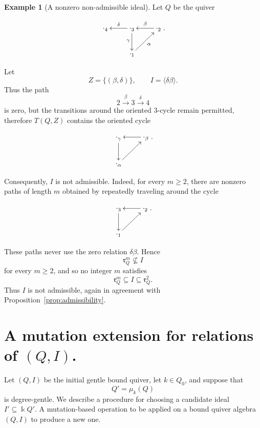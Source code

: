 \documentclass[11pt]{article}
\newcommand{\K}{\Bbbk}
\newcommand{\rad}{\mathfrak r}
\theoremstyle{plain}
\theoremstyle{definition}
\newtheorem{example}[theorem]{Example}
\theoremstyle{remark}
\begin{document}
\begin{example}[A nonzero non-admissible ideal]
Let \(Q\) be the quiver


\begin{equation}\label{}
\nonumber \xymatrix{
\cdot_{4}&\cdot_{3} \ar[d]_{\gamma} \ar[l]_{\delta}& \ar[l]_{\beta}\cdot_{2} \\
	&\cdot_{1}  \ar[ur]_{\alpha}}.
  \end{equation}


Let
\[
Z=\{(\beta,\delta)\},
\qquad
I=\langle \delta\beta\rangle.
\]
Thus the path
\[
2\xrightarrow{\beta}3\xrightarrow{\delta}4
\]
is zero, but the transitions around the oriented \(3\)-cycle remain permitted, therefore \(T(Q,Z)\) contains the oriented cycle

\begin{equation}\label{}
\nonumber \xymatrix{
\cdot_{\gamma} \ar[d] & \ar[l]\cdot_{\beta} \\
	\cdot_{\alpha}  \ar[ur]}.
  \end{equation}

Consequently, \(I\) is not admissible. Indeed, for every \(m\geq 2\), there
are nonzero paths of length \(m\) obtained by repeatedly traveling around the
cycle

\begin{equation}\label{}
\nonumber \xymatrix{
\cdot_{3} \ar[d] & \ar[l]\cdot_{2} \\
	\cdot_{1}  \ar[ur]}.
  \end{equation}

These paths never use the zero relation \(\delta\beta\). Hence
\[
\rad_Q^m\nsubseteq I
\]
for every \(m\geq 2\), and so no integer \(m\) satisfies
\[
\rad_Q^m\subseteq I\subseteq \rad_Q^2.
\]
Thus \(I\) is not admissible, again in agreement with
Proposition~\ref{prop:admissibility}.
\end{example}



\section{A mutation extension for relations of \((Q, I)\).}

Let \((Q,I)\) be the initial gentle bound quiver, let \(k\in Q_0\), and suppose that
\[
  Q'=\mu_k(Q)
\]
is degree-gentle.  We describe a procedure for choosing a candidate ideal
\(I'\subseteq \K Q'\). A mutation-based operation to be applied on a bound quiver algebra \((Q, I)\) to produce a new one.
\end{document}

